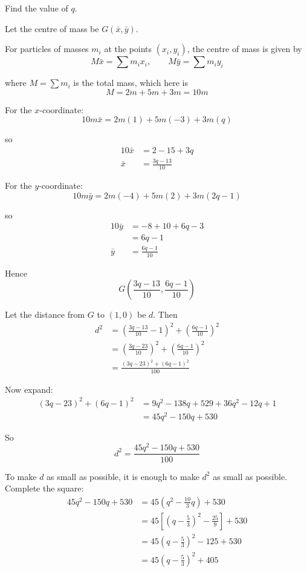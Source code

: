 \documentclass[leqno]{article}
\begin{document}
\begin{enumerate}[
  label=\textbf{\arabic*.},
  leftmargin=*,
  topsep=0pt,
  partopsep=0pt,
  parsep=0pt
]
Find the value of $q$.  \\

\vspace*{10pt}

\begin{djsSolution}
Let the centre of mass be \(G(\bar x,\bar y)\).

For particles of masses \(m_i\) at the points \((x_i,y_i)\), the centre of mass is given by
\[
M\bar{x}=\sum m_ix_i,\qquad M\bar{y}=\sum m_iy_i
\]

where \(M=\sum m_i\) is the total mass, which here is
\[
M=2m+5m+3m=10m
\]

For the \(x\)-coordinate:
\[
10m\bar x=2m(1)+5m(-3)+3m(q)
\]

so
\begin{align*}
10\bar x&=2-15+3q\\
\bar x&=\frac{3q-13}{10}
\end{align*}

For the \(y\)-coordinate:
\[
10m\bar y=2m(-4)+5m(2)+3m(2q-1)
\]

so
\begin{align*}
10\bar y&=-8+10+6q-3\\
&=6q-1\\
\bar y&=\frac{6q-1}{10}
\end{align*}

Hence
\[
G\left(\frac{3q-13}{10},\frac{6q-1}{10}\right)
\]

Let the distance from \(G\) to \((1,0)\) be \(d\). Then
\begin{align*}
d^2&=\left(\frac{3q-13}{10}-1\right)^2+\left(\frac{6q-1}{10}\right)^2\\
&=\left(\frac{3q-23}{10}\right)^2+\left(\frac{6q-1}{10}\right)^2\\
&=\frac{(3q-23)^2+(6q-1)^2}{100}
\end{align*}

Now expand:
\begin{align*}
(3q-23)^2+(6q-1)^2&=9q^2-138q+529+36q^2-12q+1\\
&=45q^2-150q+530
\end{align*}

So
\[
d^2=\frac{45q^2-150q+530}{100}
\]

To make \(d\) as small as possible, it is enough to make \(d^2\) as small as possible. Complete the square:
\begin{align*}
45q^2-150q+530
&=45\left(q^2-\frac{10}{3}q\right)+530\\
&=45\left[\left(q-\frac{5}{3}\right)^2-\frac{25}{9}\right]+530\\
&=45\left(q-\frac{5}{3}\right)^2-125+530\\
&=45\left(q-\frac{5}{3}\right)^2+405
\end{align*}


\end{djsSolution}
\end{enumerate}
\end{document}
